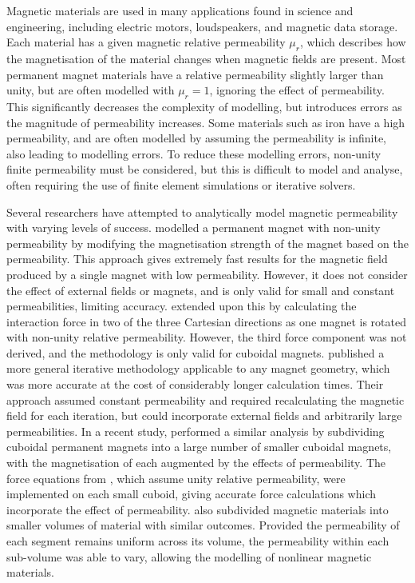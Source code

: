 Magnetic materials are used in many applications found in science and engineering, including electric motors, loudspeakers, and magnetic data storage. Each material has a given magnetic relative permeability \(\mu_r\), which describes how the magnetisation of the material changes when magnetic fields are present. Most permanent magnet materials have a relative permeability slightly larger than unity, but are often modelled with \(\mu_r = 1\), ignoring the effect of permeability. This significantly decreases the complexity of modelling, but introduces errors as the magnitude of permeability increases. Some materials such as iron have a high permeability, and are often modelled by assuming the permeability is infinite, also leading to modelling errors. To reduce these modelling errors, non-unity finite permeability must be considered, but this is difficult to model and analyse, often requiring the use of finite element simulations or iterative solvers.

Several researchers have attempted to analytically model magnetic permeability with varying levels of success. \textcite{Kremers2013} modelled a permanent magnet with non-unity permeability by modifying the magnetisation strength of the magnet based on the permeability. This approach gives extremely fast results for the magnetic field produced by a single magnet with low permeability. However, it does not consider the effect of external fields or magnets, and is only valid for small and constant permeabilities, limiting accuracy. \textcite{Dam2016} extended upon this by calculating the interaction force in two of the three Cartesian directions as one magnet is rotated with non-unity relative permeability. However, the third force component was not derived, and the methodology is only valid for cuboidal magnets. \textcite{Casteren2014} published a more general iterative methodology applicable to any magnet geometry, which was more accurate at the cost of considerably longer calculation times. Their approach assumed constant permeability and required recalculating the magnetic field for each iteration, but could incorporate external fields and arbitrarily large permeabilities. In a recent study, \textcite{Zhang2021} performed a similar analysis by subdividing cuboidal permanent magnets into a large number of smaller cuboidal magnets, with the magnetisation of each augmented by the effects of permeability. The force equations from \textcite{Akoun1984}, which assume unity relative permeability, were implemented on each small cuboid, giving accurate force calculations which incorporate the effect of permeability. \textcite{Forbes2021} also subdivided magnetic materials into smaller volumes of material with similar outcomes. Provided the permeability of each segment remains uniform across its volume, the permeability within each sub-volume was able to vary, allowing the modelling of nonlinear magnetic materials.

